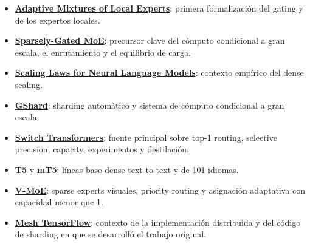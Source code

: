 \documentclass[a4paper]{article}
\begin{document}
{\small
\begin{itemize}[nosep,leftmargin=*]
  \item \href{https://doi.org/10.1162/neco.1991.3.1.79}{\textbf{Adaptive Mixtures of Local Experts}}: primera formalización del gating y de los expertos locales.
  \item \href{https://arxiv.org/abs/1701.06538}{\textbf{Sparsely-Gated MoE}}: precursor clave del cómputo condicional a gran escala, el enrutamiento y el equilibrio de carga.
  \item \href{https://arxiv.org/abs/2001.08361}{\textbf{Scaling Laws for Neural Language Models}}: contexto empírico del dense scaling.
  \item \href{https://arxiv.org/abs/2006.16668}{\textbf{GShard}}: sharding automático y sistema de cómputo condicional a gran escala.
  \item \href{https://arxiv.org/abs/2101.03961}{\textbf{Switch Transformers}}: fuente principal sobre top-1 routing, selective precision, capacity, experimentos y destilación.
  \item \href{https://arxiv.org/abs/1910.10683}{\textbf{T5}} y \href{https://arxiv.org/abs/2010.11934}{\textbf{mT5}}: líneas base dense text-to-text y de 101 idiomas.
  \item \href{https://arxiv.org/abs/2106.05974}{\textbf{V-MoE}}: sparse experts visuales, priority routing y asignación adaptativa con capacidad menor que 1.
  \item \href{https://github.com/tensorflow/mesh}{\textbf{Mesh TensorFlow}}: contexto de la implementación distribuida y del código de sharding en que se desarrolló el trabajo original.
\end{itemize}
}
\end{document}
